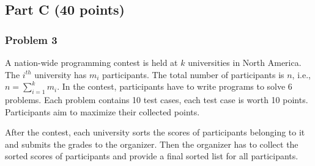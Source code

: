 \documentclass[11pt]{article}
\begin{document}
\subsection*{Part C (40 points)}

\subsubsection*{Problem 3} 

A nation-wide programming contest is held
at $k$ universities in North America. The $i^{th}$ university has
$m_{i}$ participants. The total number of participants is $n$, i.e.,
$n = \sum_{i=1}^{k}m_{i}$. In the contest, participants have to write
programs to solve 6 problems. Each problem contains 10 test cases,
each test case is worth 10 points. Participants aim to maximize their
collected points.  

After the contest, each university sorts the scores of participants
belonging to it and submits the grades to the organizer.  Then the
organizer has to collect the sorted scores of participants and provide
a final sorted list for all participants.
\end{document}
